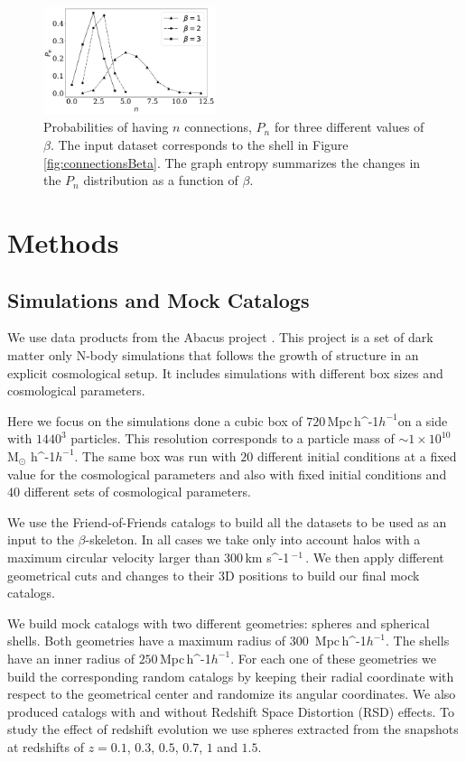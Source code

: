 \documentclass[fleqn,usenatbib]{mnras}
\newcommand{\Msunh}{\,{\rm M}$_{\odot}$\,\,\ifmmode h^{-1}\else $h^{-1}$\fi}
\newcommand{\kms}{\,{\rm km s}\ifmmode ^{-1}\,\else $^{-1}$\,\fi}
\newcommand{\Mpch}{\,{\rm Mpc}\,\ifmmode h^{-1}\else $h^{-1}$\fi}
\begin{document}
\begin{figure}
    \includegraphics[width=0.45\textwidth]{probabilities.pdf}
    \caption{Probabilities of having $n$ connections, $P_n$ for three different values of
    $\beta$. The input dataset corresponds to the shell in Figure \ref{fig:connectionsBeta}.
    The graph entropy summarizes the changes in the $P_n$ distribution as a function of $\beta$.}
    \label{fig:probabilities}
\end{figure}


\section{Methods}


\subsection{Simulations and Mock Catalogs}

We use data products from the Abacus project \citep{abacus}.
This project is a set of dark matter only N-body simulations that follows
the growth of structure in an explicit cosmological setup.
It includes simulations with different box sizes and cosmological parameters.

Here we focus on the simulations done a cubic box of $720$\Mpch on a side
with $1440^3$ particles. 
This resolution corresponds to a particle mass of $\sim1\times10^{10}$ \Msunh.
The same box was run with $20$ different initial conditions at a fixed value for
the cosmological parameters and also with fixed initial conditions and $40$ different
sets of cosmological parameters.

We use the Friend-of-Friends catalogs to build all the datasets to be used
as an input to the $\beta$-skeleton. In all cases we take only into account halos
with a maximum circular velocity larger than $300$\kms. 
We then apply different geometrical cuts and changes to their 3D positions to build 
our final mock catalogs.

We build mock catalogs with two different geometries: spheres and spherical shells.
Both geometries have a maximum radius of $300$ \Mpch.
The shells have an inner radius of $250$\Mpch.
For each one of these geometries we build the corresponding random catalogs
by keeping their radial coordinate with respect to the geometrical center and 
randomize its angular coordinates.
We also produced catalogs with and without Redshift Space Distortion (RSD) effects. 
To study the effect of redshift evolution we use spheres extracted from
the snapshots at redshifts of $z=0.1$, $0.3$, $0.5$, $0.7$, $1$ and $1.5$.
\end{document}
